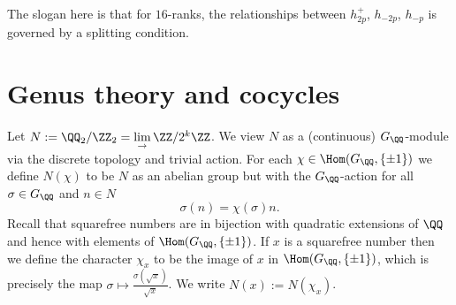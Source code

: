 \documentclass{lecturenotes}
\newcommand{\dirlim}{\lim\limits_{\rightarrow}}
\numberwithin{equation}{section}
\begin{document}
The slogan here is that for $16$-ranks, the relationships between $h_{2p}^+$, $h_{-2p}$, $h_{-p}$ is governed by a splitting condition.

\newpage\lecture{}{}
\section{Genus theory and cocycles}
\begin{notation}
    Let $N:=\QQ_2/\ZZ_2=\dirlim \ZZ/2^k\ZZ$.  We view $N$ as a (continuous) $G_\QQ$-module via the discrete topology and trivial action.  For each $\chi\in\Hom(G_\QQ,\set{\pm 1})$ we define $N(\chi)$ to be $N$ as an abelian group but with the $G_\QQ$-action for all $\sigma\in G_\QQ$ and $n\in N$
    \[\sigma(n)=\chi(\sigma) n.\]
    Recall that squarefree numbers are in bijection with quadratic extensions of $\QQ$ and hence with elements of $\Hom(G_\QQ, \set{\pm 1})$.  If $x$ is a squarefree number then we define the character $\chi_x$ to be the image of $x$ in $\Hom(G_\QQ,\set{\pm 1})$, which is precisely the map $\sigma\mapsto \frac{\sigma(\sqrt{x})}{\sqrt{x}}$.  We write $N(x):=N(\chi_x)$.
\end{notation}
\end{document}
